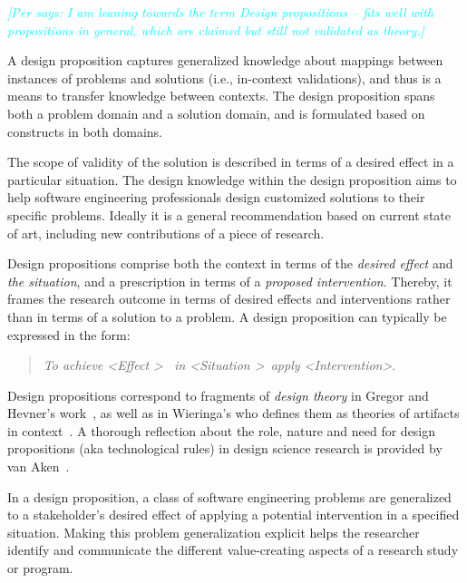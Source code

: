 \documentclass[graybox]{svmult}
\newcommand{\per}[1]{\textcolor{cyan}{{\it [Per says: #1]}}}
\newcommand{\per}[1]{}
\begin{document}
\per{I am leaning towards the term Design propositions -- fits well with propositions in general, which are claimed but still not validated as theory.}

A design proposition captures generalized knowledge about mappings between instances of problems and solutions (i.e., in-context validations), and thus is a means to transfer knowledge between contexts. The design proposition spans both a problem domain and a solution domain, and is formulated based on constructs in both domains. 

The scope of validity of the solution is described in terms of a desired effect in a particular situation. The design knowledge within the design proposition aims to help software engineering professionals design customized solutions to their specific problems. Ideally it is a general recommendation based on current state of art, including new contributions of a piece of research.

Design propositions comprise both the context in terms of the \emph{desired effect} and \emph{the situation}, and a prescription in terms of a \emph{proposed intervention}. Thereby, it frames the research outcome in terms of desired effects and interventions rather than in terms of a solution to a problem. A design proposition can typically be expressed in the form: 

\begin{quote}{\emph{To achieve \textless Effect \textgreater ~ in \textless Situation \textgreater~apply \textless Intervention\textgreater}.} 
\end{quote}
Design propositions correspond to fragments of \emph{design theory} in Gregor and Hevner's work~\cite{gregor_positioning_2013}, as well as in Wieringa's who defines them as theories of artifacts in context~\cite{wieringa_design_2009}. A thorough reflection about the role, nature and need for design propositions (aka technological rules) in design science research is provided by van Aken~\cite{van_aken_management_2004}.

In a design proposition, a class of software engineering problems are generalized to a stakeholder's desired effect of applying a potential intervention in a specified situation. 
Making this problem generalization explicit helps the researcher identify and communicate the different value-creating aspects of a research study or program.
\end{document}
